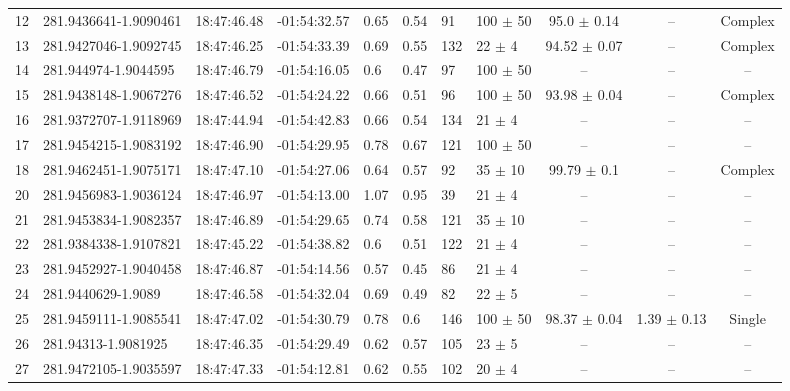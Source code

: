 \begin{table}[htbp!]
\begin{tabular}{llllllllccc}
12  &  281.9436641-1.9090461  &  18:47:46.48  &  -01:54:32.57  &  0.65  &  0.54  &  91  &  100 $\pm$ 50  &  95.0 $\pm$ 0.14  &  --  &  Complex \\
13  &  281.9427046-1.9092745  &  18:47:46.25  &  -01:54:33.39  &  0.69  &  0.55  &  132  &  22 $\pm$ 4  &  94.52 $\pm$ 0.07  &  --  &  Complex \\
14  &  281.944974-1.9044595  &  18:47:46.79  &  -01:54:16.05  &  0.6  &  0.47  &  97  &  100 $\pm$ 50  &  --  &  --  &  -- \\
15  &  281.9438148-1.9067276  &  18:47:46.52  &  -01:54:24.22  &  0.66  &  0.51  &  96  &  100 $\pm$ 50  &  93.98 $\pm$ 0.04  &  --  &  Complex \\
16  &  281.9372707-1.9118969  &  18:47:44.94  &  -01:54:42.83  &  0.66  &  0.54  &  134  &  21 $\pm$ 4  &  --  &  --  &  -- \\
17  &  281.9454215-1.9083192  &  18:47:46.90  &  -01:54:29.95  &  0.78  &  0.67  &  121  &  100 $\pm$ 50  &  --  &  --  &  -- \\
18  &  281.9462451-1.9075171  &  18:47:47.10  &  -01:54:27.06  &  0.64  &  0.57  &  92  &  35 $\pm$ 10  &  99.79 $\pm$ 0.1  &  --  &  Complex \\
20  &  281.9456983-1.9036124  &  18:47:46.97  &  -01:54:13.00  &  1.07  &  0.95  &  39  &  21 $\pm$ 4  &  --  &  --  &  -- \\
21  &  281.9453834-1.9082357  &  18:47:46.89  &  -01:54:29.65  &  0.74  &  0.58  &  121  &  35 $\pm$ 10  &  --  &  --  &  -- \\
22  &  281.9384338-1.9107821  &  18:47:45.22  &  -01:54:38.82  &  0.6  &  0.51  &  122  &  21 $\pm$ 4  &  --  &  --  &  -- \\
23  &  281.9452927-1.9040458  &  18:47:46.87  &  -01:54:14.56  &  0.57  &  0.45  &  86  &  21 $\pm$ 4  &  --  &  --  &  -- \\
24  &  281.9440629-1.9089  &  18:47:46.58  &  -01:54:32.04  &  0.69  &  0.49  &  82  &  22 $\pm$ 5  &  --  &  --  &  -- \\
25  &  281.9459111-1.9085541  &  18:47:47.02  &  -01:54:30.79  &  0.78  &  0.6  &  146  &  100 $\pm$ 50  &  98.37 $\pm$ 0.04  &  1.39 $\pm$ 0.13  &  Single \\
26  &  281.94313-1.9081925  &  18:47:46.35  &  -01:54:29.49  &  0.62  &  0.57  &  105  &  23 $\pm$ 5  &  --  &  --  &  -- \\
27  &  281.9472105-1.9035597  &  18:47:47.33  &  -01:54:12.81  &  0.62  &  0.55  &  102  &  20 $\pm$ 4  &  --  &  --  &  -- \\

\end{tabular}
\end{table}
